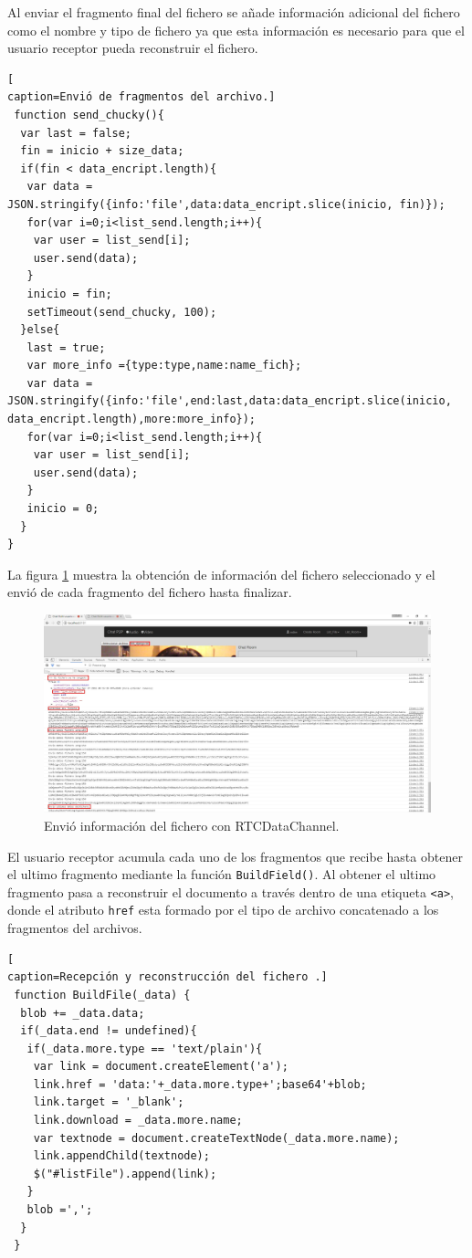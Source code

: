 Al enviar el fragmento final del fichero se añade información adicional del fichero como el nombre y tipo de fichero ya que esta información es necesario para que el usuario receptor pueda reconstruir el fichero.
\begin{lstlisting}[
caption=Envió de fragmentos del archivo.]
 function send_chucky(){
  var last = false;
  fin = inicio + size_data;
  if(fin < data_encript.length){
   var data = JSON.stringify({info:'file',data:data_encript.slice(inicio, fin)});
   for(var i=0;i<list_send.length;i++){
    var user = list_send[i];
    user.send(data);
   }
   inicio = fin;
   setTimeout(send_chucky, 100);
  }else{
   last = true;
   var more_info ={type:type,name:name_fich};
   var data = JSON.stringify({info:'file',end:last,data:data_encript.slice(inicio, data_encript.length),more:more_info});
   for(var i=0;i<list_send.length;i++){
    var user = list_send[i];
    user.send(data);
   }
   inicio = 0;
  }
}
\end{lstlisting}
La figura \ref{fig:fildSendUser} muestra la obtención de información del fichero seleccionado y el envió de cada fragmento del fichero hasta finalizar.
\begin{figure}[!h]
\centering
\includegraphics[width=1\linewidth]{Figures/filSendUser}
\decoRule
\caption[Envió información del fichero con  RTCDataChannel.]{Envió información del fichero con  RTCDataChannel.}
\label{fig:fildSendUser}
\end{figure}

El usuario receptor acumula cada uno de los fragmentos que recibe hasta obtener el ultimo fragmento mediante la función \texttt{BuildField()}. Al obtener el ultimo fragmento pasa a reconstruir el documento a través dentro de una etiqueta \texttt{<a>}, donde el atributo \texttt{href} esta formado por el tipo de archivo concatenado a los fragmentos del archivos.
\begin{lstlisting}[
caption=Recepción y reconstrucción del fichero .]
 function BuildFile(_data) {
  blob += _data.data;
  if(_data.end != undefined){
   if(_data.more.type == 'text/plain'){
    var link = document.createElement('a');
    link.href = 'data:'+_data.more.type+';base64'+blob;
    link.target = '_blank';
    link.download = _data.more.name;
    var textnode = document.createTextNode(_data.more.name);
    link.appendChild(textnode);
    $("#listFile").append(link);
   }
   blob =',';
  }
 }  
\end{lstlisting}

